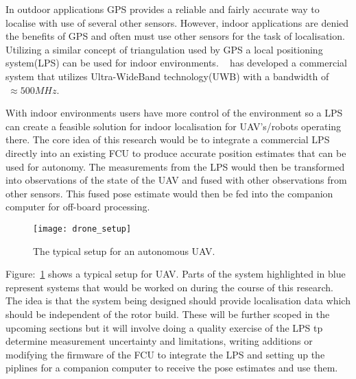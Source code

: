 In outdoor applications GPS provides a reliable and fairly accurate way to localise with use of several other sensors.
    However, indoor applications are denied the benefits of GPS and often must use other sensors for the task of localisation.
    Utilizing a similar concept of triangulation used by GPS a local positioning system(LPS) can be used for indoor environments.
    ~\citep{pozyx2018pozyx} has developed a commercial system that utilizes Ultra-WideBand technology(UWB) with a bandwidth of $~\approx 500MHz$.

    With indoor environments users have more control of the environment so a LPS can create a feasible solution for indoor localisation for UAV's/robots operating there.
    The core idea of this research would be to integrate a commercial LPS directly into an existing FCU to produce accurate position estimates that can be used for autonomy.
    The measurements from the LPS would then be transformed into observations of the state of the UAV and fused with other observations from other sensors.
    This fused pose estimate would then be fed into the companion computer for off-board processing.
    \begin{figure}[h!]
        \centering
        \texttt{[image: drone\_setup]}
        \caption{The typical setup for an autonomous UAV.}
        \label{fig:ds}
    \end{figure}

    Figure:~\ref{fig:ds} shows a typical setup for UAV.
    Parts of the system highlighted in blue represent systems that would be worked on during the course of this research.
    The idea is that the system being designed should provide localisation data which should be independent of the rotor build.
    These will be further scoped in the upcoming sections but it will involve doing a quality exercise of the LPS tp determine measurement uncertainty and limitations,
    writing additions or modifying the firmware of the FCU to integrate the LPS and setting up the piplines for a companion computer to receive the pose estimates and use them.



